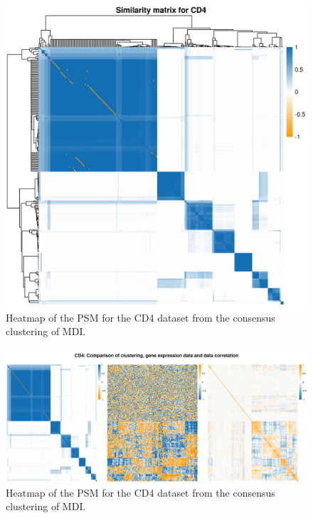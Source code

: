 \documentclass[12pt]{article} %
\begin{document}
	\newpage
	

	
	\begin{figure}[h]
		\centering
		\includegraphics[scale=0.75]{Images/Biology_data/Set_250/All_datasets/Similarity_matrices/similarity_matrix_CD4.png}
		\caption{Heatmap of the PSM for the CD4 dataset from the consensus clustering of MDI.}
		\label{fig:results:cedar_1:mdi_cd4_psm}
	\end{figure}
	
	\newpage
	
	\begin{figure}
		\centering
		\includegraphics[scale=0.5]{Images/Biology_data/Set_250/All_datasets/Comparison_expression_clustering_correlation/CD4.png}
		\caption{Heatmap of the PSM for the CD4 dataset from the consensus clustering of MDI.}
		\label{fig:results:cedar_1:mdi_cd4_psm_expr_cor}
	\end{figure}
\end{document}
